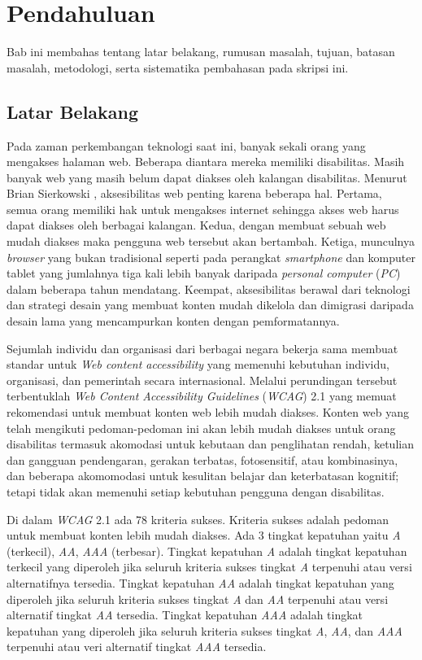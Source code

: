 \chapter{Pendahuluan}
\label{chap:intro}

Bab ini membahas tentang latar belakang, rumusan masalah, tujuan, batasan masalah, metodologi, serta sistematika pembahasan pada skripsi ini.
   
\section{Latar Belakang}
\label{sec:label}
Pada zaman perkembangan teknologi saat ini, banyak sekali orang yang mengakses halaman web. Beberapa diantara mereka memiliki disabilitas. Masih banyak web yang masih belum dapat diakses oleh kalangan disabilitas. Menurut Brian Sierkowski \cite{brian}, aksesibilitas web penting karena beberapa hal. Pertama, semua orang memiliki hak untuk mengakses internet sehingga akses web harus dapat diakses oleh berbagai kalangan. Kedua, dengan membuat sebuah web mudah diakses maka pengguna web tersebut akan bertambah. Ketiga, munculnya \textit{browser} yang bukan tradisional seperti pada perangkat \textit{smartphone} dan komputer tablet yang jumlahnya tiga kali lebih banyak daripada \textit{personal computer} (\textit{PC}) dalam beberapa tahun mendatang. Keempat, aksesibilitas berawal dari teknologi dan strategi desain yang membuat konten mudah dikelola dan dimigrasi daripada desain lama yang mencampurkan konten dengan pemformatannya.

Sejumlah individu dan organisasi dari berbagai negara bekerja sama membuat standar untuk \textit{Web content accessibility} yang memenuhi kebutuhan individu, organisasi, dan pemerintah secara internasional. Melalui perundingan tersebut terbentuklah \textit{Web Content Accessibility Guidelines} (\textit{WCAG}) 2.1 \cite{WCAG:2.1} yang memuat rekomendasi untuk membuat konten web lebih mudah diakses. Konten web yang telah mengikuti pedoman-pedoman ini akan lebih mudah diakses untuk orang disabilitas termasuk akomodasi untuk kebutaan dan penglihatan rendah, ketulian dan gangguan pendengaran, gerakan terbatas, fotosensitif, atau kombinasinya, dan beberapa akomomodasi untuk kesulitan belajar dan keterbatasan kognitif; tetapi tidak akan memenuhi setiap kebutuhan pengguna dengan disabilitas. 

Di dalam \textit{WCAG} 2.1 ada 78 kriteria sukses. Kriteria sukses adalah pedoman untuk membuat konten lebih mudah diakses. Ada 3 tingkat kepatuhan yaitu \textit{A} (terkecil), \textit{AA}, \textit{AAA} (terbesar). Tingkat kepatuhan \textit{A} adalah tingkat kepatuhan terkecil yang diperoleh jika seluruh kriteria sukses tingkat \textit{A} terpenuhi atau versi alternatifnya tersedia. Tingkat kepatuhan \textit{AA} adalah tingkat kepatuhan yang diperoleh jika seluruh kriteria sukses tingkat \textit{A} dan \textit{AA} terpenuhi atau versi alternatif tingkat \textit{AA} tersedia. Tingkat kepatuhan \textit{AAA} adalah tingkat kepatuhan yang diperoleh jika seluruh kriteria sukses tingkat \textit{A}, \textit{AA}, dan \textit{AAA} terpenuhi atau veri alternatif tingkat \textit{AAA} tersedia.


